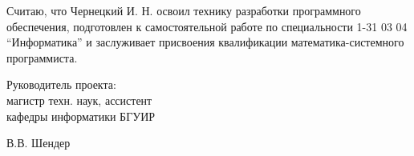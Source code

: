 \begin{singlespace}
{    Считаю, что Чернецкий И. Н. освоил технику разработки программного обеспечения, подготовлен к самостоятельной работе по специальности 1-31 03 04 ``Информатика'' и заслуживает присвоения квалификации математика-системного программиста.

    \vfill
    \noindent
    \begin{minipage}{0.55\textwidth}
      \begin{flushleft}
        Руководитель проекта:\\
        магистр техн. наук, ассистент\\
        кафедры информатики БГУИР
      \end{flushleft}
    \end{minipage}
    \begin{minipage}{0.4\textwidth}
      \begin{flushright}
        \underline{\hspace*{3cm}} В.В. Шендер
      \end{flushright}
    \end{minipage}
  }
\end{singlespace}


\newpage
